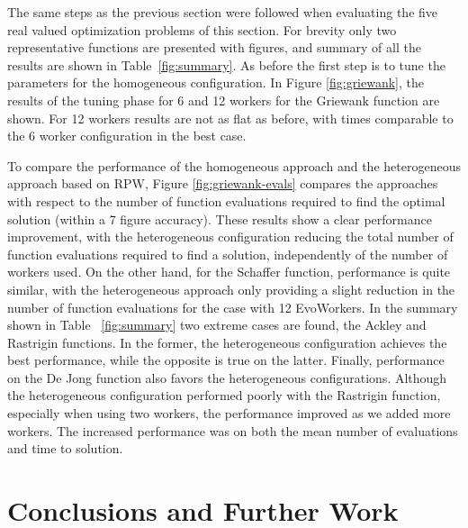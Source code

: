 \documentclass[conference]{IEEEtran}
\begin{document}
The same steps as the previous section were followed when evaluating the five real valued
optimization problems of this section.  For brevity only two representative functions are
presented with figures, and summary of all the results are shown in Table~\ref{fig:summary}. As before
the first step is to tune the parameters for the homogeneous configuration.
In Figure \ref{fig:griewank}, the results of the tuning phase for 6 and 12 workers
for the Griewank function are shown. For 12 workers results are not as flat as before,
with times comparable to the 6 worker configuration in the best case.

To compare the performance of the homogeneous approach and the heterogeneous approach based on RPW,
Figure \ref{fig:griewank-evals} compares the approaches with respect to the number of function evaluations required to find the optimal solution (within a 7 figure accuracy).
These results show a clear performance improvement, with the heterogeneous configuration
reducing the total number of function evaluations required to find a solution,
independently of the number of workers used.
On the other hand, for the Schaffer function, performance is quite similar,
with the heterogeneous approach only providing a slight reduction in the number
of function evaluations for the case with 12 EvoWorkers.
In the summary shown in Table ~\ref{fig:summary} two extreme cases are found, the Ackley and Rastrigin functions.
In the former, the heterogeneous configuration achieves the best performance, while the opposite is true on the latter.
Finally, performance on the De Jong function also favors the heterogeneous configurations.
Although the heterogeneous configuration performed poorly with the Rastrigin
function, especially when using two workers, the performance improved as we
added more workers.  The increased performance was on both the mean number of
evaluations and time to solution.


\section{Conclusions and Further Work}
\label{sec:conclusions}
\end{document}
